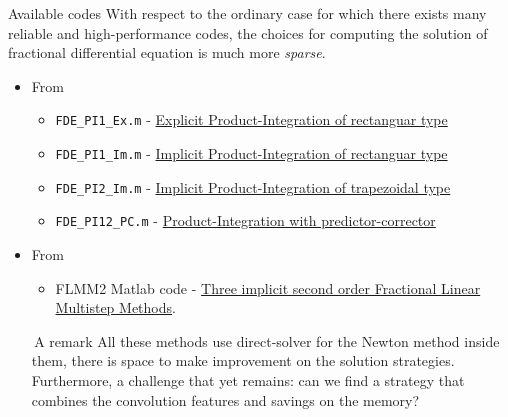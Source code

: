 \documentclass[aspectratio=169,xcolor=dvipsnames]{beamer}
\begin{document}
\begin{frame}[fragile]{\faCode\;Available codes}
With respect to the ordinary case for which there exists many reliable and high-performance codes, the choices for computing the solution of fractional differential equation is much more \emph{sparse}.

\begin{itemize}
\item From \parencite{garrappa2018numerical}
\begin{itemize}
	\item[\faCode] \verb|FDE_PI1_Ex.m| - \href{https://www.dm.uniba.it/members/garrappa/software_folder/fde_pi1_ex.m}{Explicit Product-Integration of rectanguar type}
	\item[\faCode] \verb|FDE_PI1_Im.m| - \href{https://www.dm.uniba.it/members/garrappa/software_folder/fde_pi1_im.m}{Implicit Product-Integration of rectanguar type}
	\item[\faCode] \verb|FDE_PI2_Im.m| - \href{https://www.dm.uniba.it/members/garrappa/software_folder/fde_pi2_im.m}{Implicit Product-Integration of trapezoidal type}
	\item[\faCode] \verb|FDE_PI12_PC.m| - \href{https://www.dm.uniba.it/members/garrappa/software_folder/fde_pi12_pc.m}{Product-Integration with predictor-corrector}
\end{itemize}
\item From \parencite{GarrappaTrapezoidal}
\begin{itemize}
	\item[\faCode] FLMM2 Matlab code - \href{http://www.mathworks.com/matlabcentral/fileexchange/47081-flmm2}{Three implicit second order Fractional Linear Multistep Methods}.
\end{itemize}

\begin{block}{\faBinoculars\,A remark}
All these methods use direct-solver for the Newton method inside them, there is space to make improvement on the solution strategies. Furthermore, a challenge that yet remains: can we find a strategy that combines the convolution features and savings on the memory?
\end{block}

\end{itemize}
\end{frame}
\end{document}
